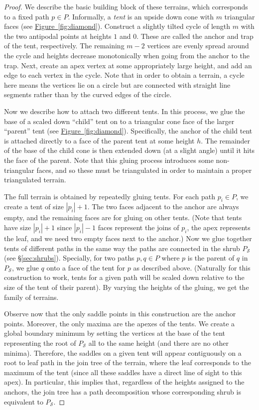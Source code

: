 \documentclass[11pt]{article}
\theoremstyle{definition}
\newcommand{\Sec}[1]{\hyperref[sec:#1]{\S\ref*{sec:#1}}} %
\newcommand{\Fig}[1]{\hyperref[fig:#1]{Figure~\ref*{fig:#1}}} %
\newcommand{\pathTree}{P_{\mathcal{S}}}
\begin{document}
\begin{proof}
 We describe the basic building block of these terrains, which corresponds to a fixed path $p\in P$.  
 Informally, a \emph{tent} is an upside down cone with $m$ triangular faces (see \Fig{diamond}). 
 Construct a slightly tilted cycle 
 of length $m$ with the two antipodal points at heights $1$ and $0$. These are called the anchor and trap of the tent, respectively.
 The remaining $m-2$ vertices are evenly spread around the cycle and heights decrease monotonically when going from the anchor to the trap.
 Next, create an apex vertex at some appropriately large height, and add an edge to each vertex in the cycle. 
 Note that in order to obtain a terrain, a cycle here means the vertices lie on a circle 
 but are connected with straight line segments rather than by the curved edges of the circle.

 Now we describe how to attach two different tents.  In this process, we glue the base of a scaled down ``child'' tent on to a triangular cone face of the larger  ``parent'' tent (see \Fig{diamond}).
 Specifically, the anchor of the child tent is attached directly to a face of the parent tent at some height $h$. The remainder of the base of the child cone is then 
 extended down (at a slight angle) until it hits the face of the parent.
 Note that this gluing process introduces some non-triangular faces, and so these must be triangulated in order to maintain a proper triangulated terrain.
 
 The full terrain is obtained by repeatedly gluing tents. For each path $p_i\in P$, we create a tent of size $|p_i|+1$.
 The two faces adjacent to the anchor are always empty, and the remaining faces are for gluing on other tents.
 (Note that tents have size $|p_i|+1$ since $|p_i|-1$ faces represent the joins of $p_i$, the apex represents the leaf, 
 and we need two empty faces next to the anchor.)
 Now we glue together tents of different paths in the same way the paths are connected in the shrub $\pathTree$ (see \Sec{shrubs}).  
 Specially, for two paths $p,q\in P$ where 
 $p$ is the parent of $q$ in $\pathTree$, we glue $q$ onto a face of the tent for $p$ as described above.
 (Naturally for this construction to work, tents for a given path will be scaled down relative to the size of the tent of their parent).
 By varying the heights of the gluing, we get the family of terrains.
 
 Observe now that the only saddle points in this construction are the anchor points.  Moreover, the only maxima are the apexes of the 
 tents.  We create a global boundary minimum by setting the vertices at the base of the tent representing the root of $\pathTree$ all to the same height (and there are no other minima).  
 Therefore, the saddles on a given tent will appear contiguously on a root to leaf path in the join tree of the terrain, where the leaf corresponds to the maximum of the tent 
 (since all these saddles have a direct line of sight to this apex).  In particular, 
 this implies that, regardless of the heights assigned to the anchors, the join tree has a path decomposition whose corresponding shrub is equivalent to $\pathTree$.  
 

\end{proof}
\end{document}
